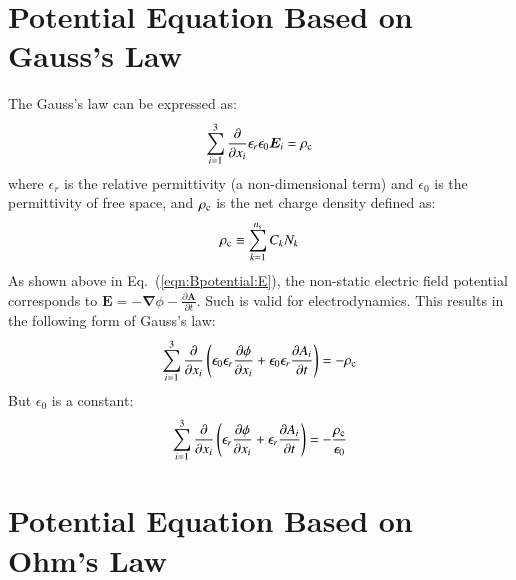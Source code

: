 \documentclass{warpdoc}
\newcommand{\ns}{{n_{\rm s}}}
\renewcommand{\vec}[1]{\bm{#1}}
\begin{document}
\section{Potential Equation Based on Gauss's Law}

The Gauss's law can be expressed as:
%
\begin{equation}
    \sum_{i=1}^3 \frac{\partial }{\partial x_i} \epsilon_r \epsilon_0 \vec{E}_i = \rho_{\rm c} 
\end{equation}
%
where $\epsilon_r$ is the relative permittivity (a non-dimensional term) and $\epsilon_0$ is the permittivity of free space, and $\rho_{\rm c}$ is the net charge density defined as:
%
\begin{equation}
\rho_{\rm c}\equiv
\sum_{k=1}^\ns C_k N_k
\end{equation}
%
As shown above in Eq.~(\ref{eqn:Bpotential:E}), the non-static electric field potential corresponds to $\vec{E}=  -\vec{\nabla} \phi -\frac{\partial \vec{A}}{\partial t}$. Such is valid for electrodynamics.  This results in the following form of Gauss's law:
%
\begin{equation}
 \sum_{i=1}^3 \frac{\partial }{\partial x_i}\left(\epsilon_0 \epsilon_r \frac{\partial \phi}{\partial x_i} + \epsilon_0 \epsilon_r\frac{\partial A_i}{\partial t} \right)=   -\rho_{\rm c} 
\end{equation}
%
But $\epsilon_0$ is a constant:
%
\begin{equation}
 \sum_{i=1}^3 \frac{\partial }{\partial x_i}\left( \epsilon_r \frac{\partial \phi}{\partial x_i} + \epsilon_r\frac{\partial A_i}{\partial t} \right)=   -\frac{\rho_{\rm c}}{\epsilon_0} 
\end{equation}
%


\section{Potential Equation Based on Ohm's Law}
\end{document}
